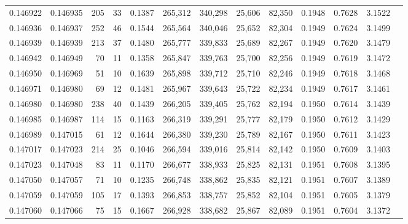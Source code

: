 \begin{tabular}{rrrrrrrrrrrrr}
0.146922 & 0.146935 &   205 &  33 &                                     0.1387 & 265,312 & 340,298 &  25,606 &  82,350 & 0.1948 & 0.7628 & 3.1522 \\
0.146936 & 0.146937 &   252 &  46 &                                     0.1544 & 265,564 & 340,046 &  25,652 &  82,304 & 0.1949 & 0.7624 & 3.1499 \\
0.146939 & 0.146939 &   213 &  37 &                                     0.1480 & 265,777 & 339,833 &  25,689 &  82,267 & 0.1949 & 0.7620 & 3.1479 \\
0.146942 & 0.146949 &    70 &  11 &                                     0.1358 & 265,847 & 339,763 &  25,700 &  82,256 & 0.1949 & 0.7619 & 3.1472 \\
0.146950 & 0.146969 &    51 &  10 &                                     0.1639 & 265,898 & 339,712 &  25,710 &  82,246 & 0.1949 & 0.7618 & 3.1468 \\
0.146971 & 0.146980 &    69 &  12 &                                     0.1481 & 265,967 & 339,643 &  25,722 &  82,234 & 0.1949 & 0.7617 & 3.1461 \\
0.146980 & 0.146980 &   238 &  40 &                                     0.1439 & 266,205 & 339,405 &  25,762 &  82,194 & 0.1950 & 0.7614 & 3.1439 \\
0.146985 & 0.146987 &   114 &  15 &                                     0.1163 & 266,319 & 339,291 &  25,777 &  82,179 & 0.1950 & 0.7612 & 3.1429 \\
0.146989 & 0.147015 &    61 &  12 &                                     0.1644 & 266,380 & 339,230 &  25,789 &  82,167 & 0.1950 & 0.7611 & 3.1423 \\
0.147017 & 0.147023 &   214 &  25 &                                     0.1046 & 266,594 & 339,016 &  25,814 &  82,142 & 0.1950 & 0.7609 & 3.1403 \\
0.147023 & 0.147048 &    83 &  11 &                                     0.1170 & 266,677 & 338,933 &  25,825 &  82,131 & 0.1951 & 0.7608 & 3.1395 \\
0.147050 & 0.147057 &    71 &  10 &                                     0.1235 & 266,748 & 338,862 &  25,835 &  82,121 & 0.1951 & 0.7607 & 3.1389 \\
0.147059 & 0.147059 &   105 &  17 &                                     0.1393 & 266,853 & 338,757 &  25,852 &  82,104 & 0.1951 & 0.7605 & 3.1379 \\
0.147060 & 0.147066 &    75 &  15 &                                     0.1667 & 266,928 & 338,682 &  25,867 &  82,089 & 0.1951 & 0.7604 & 3.1372 \\

\end{tabular}
